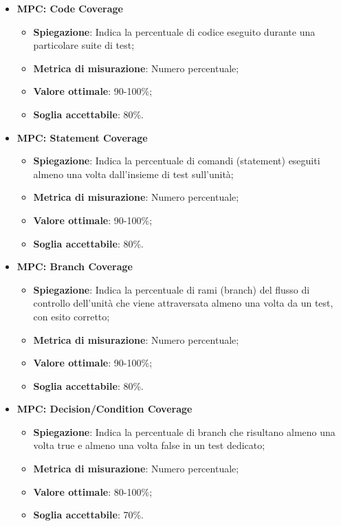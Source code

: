 \begin{itemize}
    \item \textbf{MPC: Code Coverage}
    \begin{itemize}
        \item \textbf{Spiegazione}: Indica la percentuale di codice eseguito durante una particolare suite di test;
        \item \textbf{Metrica di misurazione}: Numero percentuale;
        \item \textbf{Valore ottimale}: 90-100\%;
        \item \textbf{Soglia accettabile}: 80\%.
    \end{itemize}
\end{itemize}

\begin{itemize}
    \item \textbf{MPC: Statement Coverage}
    \begin{itemize}
        \item \textbf{Spiegazione}: Indica la percentuale di comandi (statement) eseguiti almeno una volta dall'insieme di test sull'unità;
        \item \textbf{Metrica di misurazione}: Numero percentuale;
        \item \textbf{Valore ottimale}: 90-100\%;
        \item \textbf{Soglia accettabile}: 80\%.
    \end{itemize}
\end{itemize}

\begin{itemize}
    \item \textbf{MPC: Branch Coverage}
    \begin{itemize}
        \item \textbf{Spiegazione}: Indica la percentuale di rami (branch) del flusso di controllo dell'unità che viene attraversata almeno una volta da un test, con esito corretto;
        \item \textbf{Metrica di misurazione}: Numero percentuale;
        \item \textbf{Valore ottimale}: 90-100\%;
        \item \textbf{Soglia accettabile}: 80\%.
    \end{itemize}
\end{itemize}

\begin{itemize}
    \item \textbf{MPC: Decision/Condition Coverage}
    \begin{itemize}
        \item \textbf{Spiegazione}: Indica la percentuale di branch che risultano almeno una volta true e almeno una volta false in un test dedicato;
        \item \textbf{Metrica di misurazione}: Numero percentuale;
        \item \textbf{Valore ottimale}: 80-100\%;
        \item \textbf{Soglia accettabile}: 70\%.
    \end{itemize}
\end{itemize}

